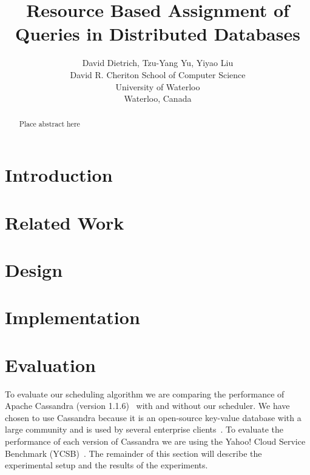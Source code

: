 \documentclass[]{acm_proc_article-sp}
\begin{document}
\title{Resource Based Assignment of Queries in Distributed Databases}

\author{
  David Dietrich, Tzu-Yang Yu, Yiyao Liu \\
  David R. Cheriton School of Computer Science \\
  University of Waterloo \\
  Waterloo, Canada \\
}

\maketitle


\begin{abstract}
Place abstract here
\end{abstract}

\section{Introduction}

\section{Related Work}

\section{Design}

\section{Implementation}

\section{Evaluation}
To evaluate our scheduling algorithm we are comparing the performance of Apache Cassandra (version 1.1.6)~\cite{Lakshman:2010:CDS:1773912.1773922} with and without our scheduler. We have chosen to use Cassandra because it is an open-source key-value database with a large community and is used by several enterprise clients~\cite{DataStaxCassandra}. To evaluate the performance of each version of Cassandra we are using the Yahoo! Cloud Service Benchmark (YCSB)~\cite{Cooper:2010:BCS:1807128.1807152}. The remainder of this section will describe the experimental setup and the results of the experiments.
\end{document}
